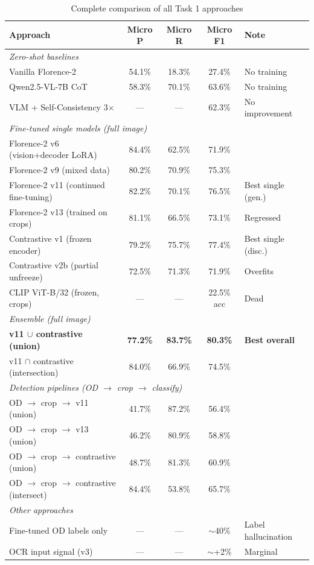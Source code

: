 \documentclass[11pt]{article}
\begin{document}
\begin{table}[h]
\centering
\caption{Complete comparison of all Task 1 approaches}
\label{tab:all_approaches}
\small
\begin{tabular}{lcccl}
\toprule
Approach & Micro P & Micro R & Micro F1 & Note \\
\midrule
\multicolumn{5}{l}{\textit{Zero-shot baselines}} \\
\midrule
Vanilla Florence-2 & 54.1\% & 18.3\% & 27.4\% & No training \\
Qwen2.5-VL-7B CoT & 58.3\% & 70.1\% & 63.6\% & No training \\
VLM + Self-Consistency 3$\times$ & --- & --- & 62.3\% & No improvement \\
\midrule
\multicolumn{5}{l}{\textit{Fine-tuned single models (full image)}} \\
\midrule
Florence-2 v6 (vision+decoder LoRA) & 84.4\% & 62.5\% & 71.9\% & \\
Florence-2 v9 (mixed data) & 80.2\% & 70.9\% & 75.3\% & \\
Florence-2 v11 (continued fine-tuning) & 82.2\% & 70.1\% & 76.5\% & Best single (gen.) \\
Florence-2 v13 (trained on crops) & 81.1\% & 66.5\% & 73.1\% & Regressed \\
Contrastive v1 (frozen encoder) & 79.2\% & 75.7\% & 77.4\% & Best single (disc.) \\
Contrastive v2b (partial unfreeze) & 72.5\% & 71.3\% & 71.9\% & Overfits \\
CLIP ViT-B/32 (frozen, crops) & --- & --- & 22.5\% acc & Dead \\
\midrule
\multicolumn{5}{l}{\textit{Ensemble (full image)}} \\
\midrule
\textbf{v11 $\cup$ contrastive (union)} & \textbf{77.2\%} & \textbf{83.7\%} & \textbf{80.3\%} & \textbf{Best overall} \\
v11 $\cap$ contrastive (intersection) & 84.0\% & 66.9\% & 74.5\% & \\
\midrule
\multicolumn{5}{l}{\textit{Detection pipelines (OD $\rightarrow$ crop $\rightarrow$ classify)}} \\
\midrule
OD $\rightarrow$ crop $\rightarrow$ v11 (union) & 41.7\% & 87.2\% & 56.4\% & \\
OD $\rightarrow$ crop $\rightarrow$ v13 (union) & 46.2\% & 80.9\% & 58.8\% & \\
OD $\rightarrow$ crop $\rightarrow$ contrastive (union) & 48.7\% & 81.3\% & 60.9\% & \\
OD $\rightarrow$ crop $\rightarrow$ contrastive (intersect) & 84.4\% & 53.8\% & 65.7\% & \\
\midrule
\multicolumn{5}{l}{\textit{Other approaches}} \\
\midrule
Fine-tuned OD labels only & --- & --- & $\sim$40\% & Label hallucination \\
OCR input signal (v3) & --- & --- & $\sim$+2\% & Marginal \\
\bottomrule
\end{tabular}
\end{table}
\end{document}

